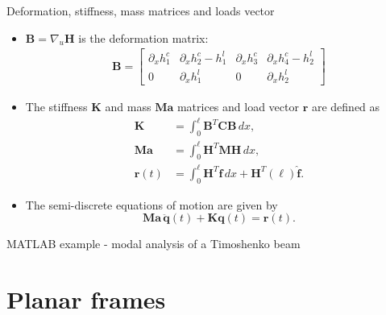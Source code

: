 \documentclass[aspectratio=169]{beamer}
\begin{document}
{\begin{frame}{Deformation, stiffness, mass matrices and loads vector}
  \begin{itemize}
    \item $\mathbf B=\nabla_u\mathbf H$ is the deformation matrix:
          \begin{align*}
            \mathbf B
            =\left[
              \begin{array}{cccc}
                \partial_x{h_1^c} & \partial_x{h_2^c}-h_1^l & \partial_x{h_3^c} & \partial_x{h_4^c}-h_2^l \\
                0                 & \partial_x{h_1^l}       & 0                 & \partial_x{h_2^l}
              \end{array}\right]
          \end{align*}
    \item The stiffness $\mathbf K$ and mass $\mathbf{Ma}$ matrices and load vector $\mathbf r$ are defined as
          \begin{align*}
            \mathbf K    & =\int_0^\ell \mathbf B^T\mathbf C\mathbf B \, dx,                                   \\
            \mathbf{Ma}  & =\int_0^\ell \mathbf H^T\mathbf M\mathbf H \, dx,                                   \\
            \mathbf r(t) & = \int_{0}^{\ell} \mathbf H^{T}\mathbf f\, dx + \mathbf H^{T}(\ell)\mathbf{\hat f}.
          \end{align*}
    \item The semi-discrete equations of motion are given by
          $$\mathbf{Ma}\,\ddot{\mathbf q}(t)+\mathbf K\mathbf q(t)=\mathbf r(t).$$
  \end{itemize}
\end{frame}
}

\begin{frame}{MATLAB example - modal analysis of a Timoshenko beam}
  \begin{center}
    \href{https://drive.mathworks.com/sharing/6a9792ef-d0a7-4aca-a1d0-8b1862b0ac3b}{}
  \end{center}
\end{frame}


\section{Planar frames}
\end{document}
